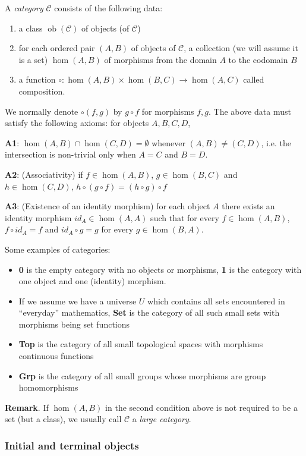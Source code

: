 A \emph{category} $\mathcal{C}$ consists of the following data:
\begin{enumerate}
\item a class $\operatorname{ob}(\mathcal{C})$ of objects (of $\mathcal{C}$)
\item for each ordered pair $(A,B)$ of objects of $\mathcal{C}$, a collection (we will assume it is
 a set) $\hom(A,B)$ of morphisms from the domain $A$ to the codomain $B$
\item a function $\circ:\hom(A,B)\times\hom(B,C)\to\hom(A,C)$ called composition.
\end{enumerate}

We normally denote $\circ(f,g)$ by $g \circ f$ for morphisms $f,g$. The above data must satisfy the following axioms: for objects $A,B,C,D$,

\textbf{A1}: $\hom(A,B) \cap \hom(C,D)=\emptyset$ whenever $(A,B)\neq (C,D)$, i.e. the intersection is non-trivial only when $A=C$ and $B=D$.

\textbf{A2}: (Associativity) if $f \in \hom(A,B)$, $g\in\hom(B,C)$ and $h\in\hom(C,D)$, $h\circ (g\circ f)=(h\circ g)\circ f$

\textbf{A3}: (Existence of an identity morphism) for each object $A$ there exists an identity morphism $ {}id_{A}\in\hom(A,A)$ such that for every $f\in\hom(A,B)$, $f\circ id_{A}=f$ and $ {}id_{A}\circ g=g$ for every $g \in \hom(B,A)$.

Some examples of categories:
\begin{itemize}
\item \textbf{0} is the empty category with no objects or morphisms, \textbf{1} is the category with one object and one (identity) morphism.
\item If we assume we have a universe $U$ which contains all sets encountered in ``everyday'' mathematics,
\textbf{Set} is the category of all such small sets with morphisms being set functions
\item \textbf{Top} is the category of all small topological spaces with morphisms continuous functions 
\item \textbf{Grp} is the category of all small groups whose morphisms are group homomorphisms 
\end{itemize}

\textbf{Remark}.  If $\hom(A,B)$ in the second condition above is not required to be a set (but a class), we usually call $\mathcal{C}$ a \emph{large category}.

\subsubsection*{Initial and terminal objects}


